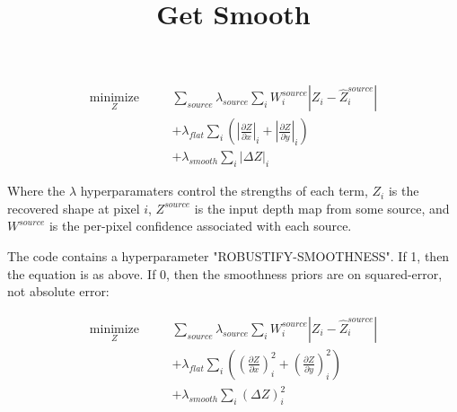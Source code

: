 \documentclass{article}
\title{Get Smooth}
\begin{document}
	
\maketitle



\begin{eqnarray}
\displaystyle \underset{Z}{\operatorname{minimize}} &\quad&  \sum_{\mathit{source}} \lambda_{\mathit{source}} \sum_i W_i^\mathit{source} | Z_i - \hat{Z}_i^\mathit{source} | \\
 &\quad&  + \lambda_{\mathit{flat}} \sum_i \left( \left| \frac{\partial Z}{\partial x }  \right|_i + \left| \frac{\partial Z}{\partial y }  \right|_i  \right)  \\
 &\quad& + \lambda_{\mathit{smooth}} \sum_i \left| \Delta Z \right|_i 
\end{eqnarray}

Where the $\lambda$ hyperparamaters control the strengths of each term, $Z_i$ is the recovered shape at pixel $i$, $Z^\mathit{source}$ is the input depth map from some source, and $W^\mathit{source}$ is the per-pixel confidence associated with each source.

The code contains a hyperparameter "ROBUSTIFY-SMOOTHNESS". If 1, then the equation is as above. If 0, then the smoothness priors are on squared-error, not absolute error: 

\begin{eqnarray}
\displaystyle \underset{Z}{\operatorname{minimize}} &\quad&  \sum_{\mathit{source}} \lambda_{\mathit{source}} \sum_i W_i^\mathit{source} | Z_i - \hat{Z}_i^\mathit{source} | \\
 &\quad&  + \lambda_{\mathit{flat}} \sum_i \left( \left( \frac{\partial Z}{\partial x }  \right)^2_i + \left( \frac{\partial Z}{\partial y }  \right)^2_i  \right)  \\
 &\quad& + \lambda_{\mathit{smooth}} \sum_i \left( \Delta Z \right)^2_i 
\end{eqnarray}


{\small


}
\end{document}
